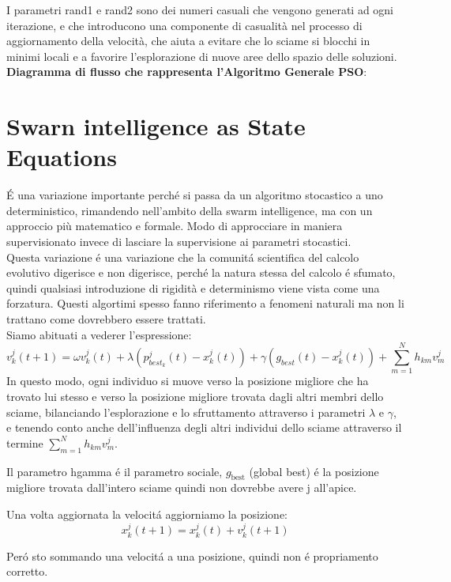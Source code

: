 I parametri rand1 e rand2 sono dei numeri casuali che vengono generati ad ogni iterazione, e che
introducono una componente di casualità nel processo di aggiornamento della velocità,
che aiuta a evitare che lo sciame si blocchi in minimi locali e a favorire l'esplorazione 
di nuove aree dello spazio delle soluzioni.\\

\textbf{Diagramma di flusso che rappresenta l'Algoritmo Generale PSO}:

\section{Swarn intelligence as State Equations}
É una variazione importante perché si passa da un algoritmo stocastico a uno deterministico, 
rimandendo nell'ambito della swarm intelligence, ma con un approccio più matematico e formale.
Modo di approcciare in maniera supervisionato invece di lasciare la supervisione ai parametri stocastici.\\

Questa variazione é una variazione che la comunitá scientifica del calcolo evolutivo digerisce e non 
digerisce, perché la natura stessa del calcolo é sfumato, quindi qualsiasi introduzione di rigidità e 
determinismo viene vista come una forzatura. Questi algortimi spesso fanno riferimento a fenomeni
naturali ma non li trattano come dovrebbero essere trattati.\\

Siamo abituati a vederer l'espressione: 
$$v_k^j(t+1)=\omega v_k^j(t)+\lambda(p^j_{{best}_k}(t)-x_k^j(t))+\gamma(g_{best}(t)-x_k^j(t))+ \sum_{m=1}^N h_{km}v_m^j$$
In questo modo, ogni individuo si muove verso la posizione migliore che ha trovato lui stesso
e verso la posizione migliore trovata dagli altri membri dello sciame, bilanciando l'esplorazione e lo 
sfruttamento attraverso i parametri $\lambda$ e $\gamma$, e tenendo conto anche dell'influenza degli altri 
individui dello sciame attraverso il termine $\sum_{m=1}^N h_{km}v_m^j$.

Il parametro hgamma é il parametro sociale, $g_{\text{best}}$ (global best) é la posizione migliore trovata dall'intero sciame quindi non 
dovrebbe avere j all'apice.

Una volta aggiornata la velocitá aggiorniamo la posizione:
$$x_k^j(t+1)=x_k^j(t)+v_k^j(t+1)$$

Peró sto sommando una velocitá a una posizione, quindi non é propriamento corretto.

